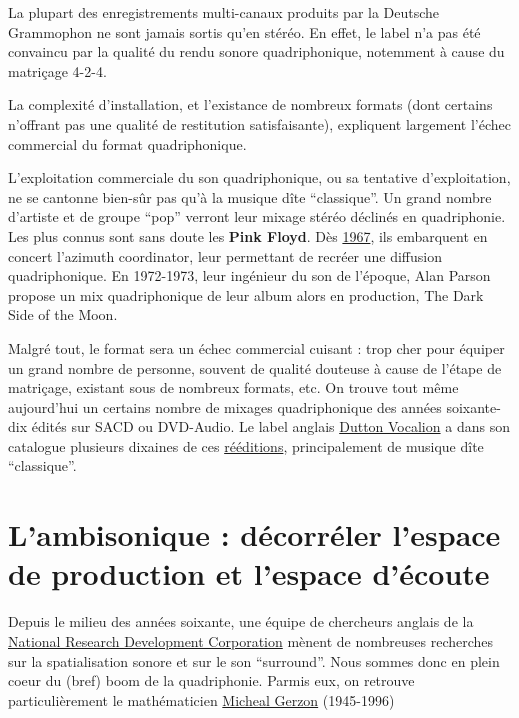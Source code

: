 \documentclass[
  letterpaper,
  DIV=11,
  numbers=noendperiod]{scrreprt}
\begin{document}
La plupart des enregistrements multi-canaux produits par la Deutsche
Grammophon ne sont jamais sortis qu'en stéréo. En effet, le label n'a
pas été convaincu par la qualité du rendu sonore quadriphonique,
notemment à cause du matriçage 4-2-4.

La complexité d'installation, et l'existance de nombreux formats (dont
certains n'offrant pas une qualité de restitution satisfaisante),
expliquent largement l'échec commercial du format quadriphonique.

L'exploitation commerciale du son quadriphonique, ou sa tentative
d'exploitation, ne se cantonne bien-sûr pas qu'à la musique dîte
``classique''. Un grand nombre d'artiste et de groupe ``pop'' verront
leur mixage stéréo déclinés en quadriphonie. Les plus connus sont sans
doute les \textbf{Pink Floyd}. Dès
\href{https://www.wired.com/2009/05/dayintech-0512/}{1967}, ils
embarquent en concert l'azimuth coordinator, leur permettant de recréer
une diffusion quadriphonique. En 1972-1973, leur ingénieur du son de
l'époque, Alan Parson propose un mix quadriphonique de leur album alors
en production, The Dark Side of the Moon.

Malgré tout, le format sera un échec commercial cuisant : trop cher pour
équiper un grand nombre de personne, souvent de qualité douteuse à cause
de l'étape de matriçage, existant sous de nombreux formats, etc. On
trouve tout même aujourd'hui un certains nombre de mixages
quadriphonique des années soixante-dix édités sur SACD ou DVD-Audio. Le
label anglais
\href{https://en.wikipedia.org/wiki/Dutton_Vocalion}{Dutton Vocalion} a
dans son catalogue plusieurs dixaines de ces
\href{https://www.duttonvocalion.co.uk/products.php?cat=3}{rééditions},
principalement de musique dîte ``classique''.

\hypertarget{lambisonique-duxe9corruxe9ler-lespace-de-production-et-lespace-duxe9coute}{%
\section{L'ambisonique : décorréler l'espace de production et l'espace
d'écoute}\label{lambisonique-duxe9corruxe9ler-lespace-de-production-et-lespace-duxe9coute}}

Depuis le milieu des années soixante, une équipe de chercheurs anglais
de la
\href{https://en.wikipedia.org/wiki/National_Research_Development_Corporation}{National
Research Development Corporation} mènent de nombreuses recherches sur la
spatialisation sonore et sur le son ``surround''. Nous sommes donc en
plein coeur du (bref) boom de la quadriphonie. Parmis eux, on retrouve
particulièrement le mathématicien
\href{https://en.wikipedia.org/wiki/Michael_Gerzon}{Micheal Gerzon}
(1945-1996)
\end{document}
